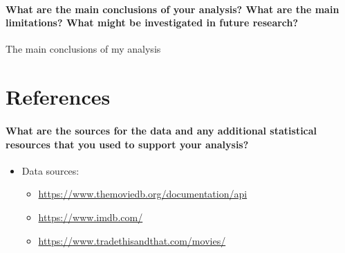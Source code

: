 \documentclass[
]{article}
\providecommand{\tightlist}{%
  \setlength{\itemsep}{0pt}\setlength{\parskip}{0pt}}
\begin{document}
\hypertarget{what-are-the-main-conclusions-of-your-analysis-what-are-the-main-limitations-what-might-be-investigated-in-future-research}{%
\paragraph{What are the main conclusions of your analysis? What are the
main limitations? What might be investigated in future
research?}\label{what-are-the-main-conclusions-of-your-analysis-what-are-the-main-limitations-what-might-be-investigated-in-future-research}}

The main conclusions of my analysis

\hypertarget{references}{%
\section{References}\label{references}}

\hypertarget{what-are-the-sources-for-the-data-and-any-additional-statistical-resources-that-you-used-to-support-your-analysis}{%
\paragraph{What are the sources for the data and any additional
statistical resources that you used to support your
analysis?}\label{what-are-the-sources-for-the-data-and-any-additional-statistical-resources-that-you-used-to-support-your-analysis}}

\begin{itemize}
\tightlist
\item
  Data sources:

  \begin{itemize}
  \tightlist
  \item
    \href{TMDB\%20API}{https://www.themoviedb.org/documentation/api}
  \item
    \href{IMDB\%20Website}{https://www.imdb.com/}
  \item
    \href{Personal\%20Movie\%20Website}{https://www.tradethisandthat.com/movies/}
  \end{itemize}
\end{itemize}
\end{document}

